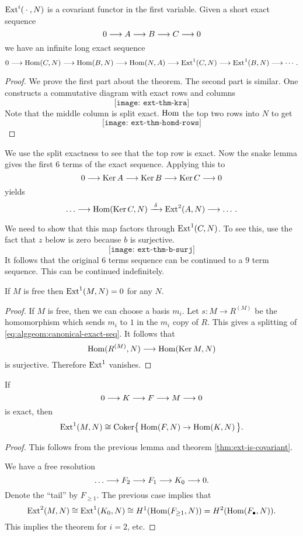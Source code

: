 \begin{theorem}
  \label{thm:ext-is-covariant}
  \(\operatorname{Ext}^i({}\cdot{},N)\) is a covariant functor in the first variable. Given
  a short exact sequence
  \[
    0\longrightarrow A\longrightarrow B\longrightarrow C\longrightarrow 0
  \]
  we have an infinite long exact sequence
  \[
    0\longrightarrow\operatorname{Hom}(C,N)\longrightarrow\operatorname{Hom}(B,N)\longrightarrow\operatorname{Hom}(N,A)\longrightarrow\operatorname{Ext}^1(C,N)\longrightarrow\operatorname{Ext}^1(B,N)\longrightarrow\cdots.
  \]
\end{theorem}
\begin{proof}
  We prove the first part about the theorem. The second part is
  similar. One constructs a commutative diagram with exact rows and columns
  \[
    \texttt{[image: ext-thm-kra]}
  \]
  Note that the middle column is split exact. \(\operatorname{Hom}\) the top two rows
  into \(N\) to get
  \[
    \texttt{[image: ext-thm-homd-rows]}
  \]
\end{proof}
We use the split exactness to see that the top row is exact. Now the snake
lemma gives the first \(6\) terms of the exact sequence. Applying this to
\[
  0\longrightarrow\operatorname{Ker} A\longrightarrow\operatorname{Ker} B\longrightarrow\operatorname{Ker} C\longrightarrow 0
\]
yields
\[
  \dotsc\longrightarrow\operatorname{Hom}(\operatorname{Ker} C,N)\xrightarrow{\,\,\delta\,\,}\operatorname{Ext}^2(A,N)\longrightarrow\dotsc.
\]

We need to show that this map factors through \(\operatorname{Ext}^1(C,N)\). To see this,
use the fact that \(z\) below is zero because \(b\) is surjective.
\[
  \texttt{[image: ext-thm-b-surj]}
\]
It follows that the original \(6\) terms sequence can be continued to a
\(9\) term sequence. This can be continued indefinitely.


\begin{lemma}
  If \(M\) is free then \(\operatorname{Ext}^1(M,N)=0\) for any \(N\).
\end{lemma}
\begin{proof}
  If \(M\) is free, then we can choose a basis \(m_i\). Let \(s\colon M\to
  R^{(M)}\) be the homomorphism which sends \(m_i\) to \(1\) in the
  \(m_i\) copy of \(R\). This gives a splitting of
  \eqref{eq:alggeom:canonical-exact-seq}. It follows that
  \[
    \operatorname{Hom}(R^{(M)},N)\longrightarrow\operatorname{Hom}(\operatorname{Ker} M,N)
  \]
  is surjective. Therefore \(\operatorname{Ext}^1\) vanishes.
\end{proof}

\begin{lemma}
  If
  \[
    0\longrightarrow K\longrightarrow F\longrightarrow M\longrightarrow 0
  \]
  is exact, then
  \[
    \operatorname{Ext}^1(M,N)\cong\operatorname{Coker}\bigl\{\,\operatorname{Hom}(F,N)\to\operatorname{Hom}(K,N)\,\bigr\}.
  \]
\end{lemma}
\begin{proof}
  This follows from the previous lemma and theorem
  \ref{thm:ext-is-covariant}.

  We have a free resolution
  \[
    \dotsc\longrightarrow F_2\longrightarrow F_1\longrightarrow K_0\longrightarrow 0.
  \]
  Denote the ``tail'' by \(F_{\geq 1}\). The previous case implies that
  \[
    \operatorname{Ext}^2(M,N)\cong\operatorname{Ext}^1(K_0,N)\cong H^1(\operatorname{Hom}(F_{\geq
      1},N))=H^2(\operatorname{Hom}(F_\bullet,N)).
  \]
  This implies the theorem for \(i=2\), etc.
\end{proof}

